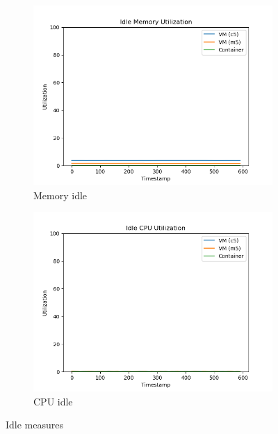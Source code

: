 \documentclass[11pt]{article}
\begin{document}
\begin{figure}[H]
\centering
\begin{subfigure}{.5\textwidth}
  \centering
  \includegraphics[width=1.1\linewidth]{idle_mem.png}
  \caption{Memory idle}
  \label{fig:idlemem}
\end{subfigure}%
\begin{subfigure}{.5\textwidth}
  \centering
  \includegraphics[width=1.1\linewidth]{idle_cpu.png}
  \caption{CPU idle}
  \label{fig:idlecpu}
\end{subfigure}
\caption{Idle measures}
\label{fig:rubis}
\end{figure}
\end{document}
